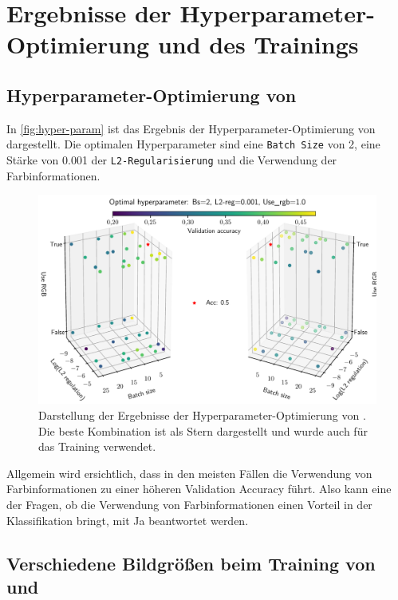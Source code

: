 \section{Ergebnisse der Hyperparameter-Optimierung und des Trainings}
\subsection{Hyperparameter-Optimierung von \MiniDog{}}

In \autoref{fig:hyper-param} ist das Ergebnis der Hyperparameter-Optimierung von \MiniDog{}
dargestellt. Die optimalen Hyperparameter sind eine \texttt{Batch Size} von 2,
eine Stärke von 0.001 der \texttt{L2-Regularisierung} und die Verwendung
der Farbinformationen.

\begin{figure}
  \centering
  \includegraphics[scale=0.6]{pics/ergebnisse/hyper_raum.pdf}
  \caption{Darstellung der Ergebnisse der Hyperparameter-Optimierung
  von \MiniDog{}. Die beste Kombination ist als Stern dargestellt und wurde auch
  für das Training verwendet.}
  \label{fig:hyper-param}
\end{figure}

Allgemein wird ersichtlich, dass in den meisten Fällen die Verwendung von Farbinformationen
zu einer höheren Validation Accuracy führt. Also kann eine der Fragen, ob die Verwendung
von Farbinformationen einen Vorteil in der Klassifikation bringt, mit Ja beantwortet werden.

\subsection{Verschiedene Bildgrößen beim  Training von \PreDog{} und \PreBig{}}

